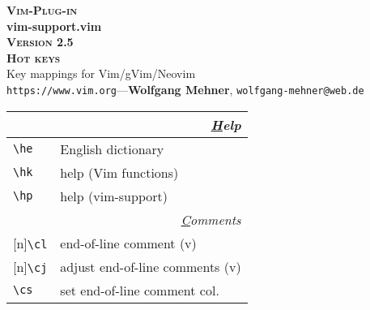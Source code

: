 \documentclass[oneside,10pt,landscape,DIV16]{scrartcl}
\newcommand{\Pluginversion}{2.5}
\newcommand{\Rep}{{\scriptsize{[n]}}}
\begin{document}
%

\begin{multicols}{3}
%
\begin{center}
%
\textbf{\textsc{\small{Vim-Plug-in}}}\\
\textbf{\LARGE{vim-support.vim}}\\
\textbf{\textsc{\small{Version \Pluginversion}}}\\
\vspace{1mm}%
\textbf{\textsc{\Huge{Hot keys}}}\\ 
\vspace{1mm}%
Key mappings for Vim/gVim/Neovim\\
{\tiny  \texttt{https://www.vim.org}\hspace{1.5mm}---\hspace{1.5mm}\textbf{Wolfgang Mehner},  \texttt{wolfgang-mehner@web.de}}\\
\vspace{1.0mm}
%
\begin{tabular}[]{|p{11mm}|p{58mm}|}
\hline 
\multicolumn{2}{|r|}{\textsl{\underline{H}elp}}\\[1.0ex]
\hline \verb'\he'                 & English dictionary   \\
\hline \verb'\hk'                 & help (Vim functions) \\
\hline \verb'\hp'                 & help (vim-support)   \\
\hline 
\hline
\multicolumn{2}{|r|}{\textsl{\underline{C}omments}}                       \\[1.0ex]
\hline \Rep\verb'\cl'   & end-of-line comment               \hfill (v)\\
\hline \Rep\verb'\cj'   & adjust end-of-line comments       \hfill (v)\\
\hline     \verb'\cs'   & set end-of-line comment col.      \\

\end{tabular}
\end{center}
\end{multicols}
\end{document}
